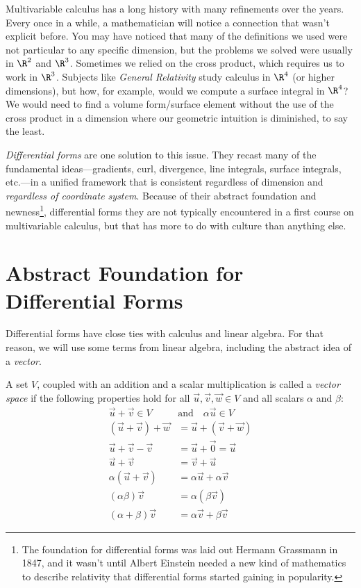
Multivariable calculus has a long history with many refinements over the years.
Every once in a while, a mathematician will notice a connection
that wasn't explicit before.  You may have noticed that many of the
definitions we used were not particular to any specific dimension, but the problems
we solved were usually in $\R^2$ and $\R^3$.  Sometimes we relied
on the cross product, which requires us to
work in $\R^3$.  
Subjects like \emph{General Relativity} study
calculus in $\R^4$ (or higher dimensions), but how, for example,
would we compute a surface integral in $\R^4$?  We would need
to find a volume form/surface element without the use of the cross product in a dimension
where our geometric intuition is diminished, to say the least.

\emph{Differential forms} are one solution to this issue.
They recast many of the fundamental ideas---gradients, curl, divergence,
line integrals, surface integrals, etc.---in a unified framework that is consistent
regardless of dimension and \emph{regardless of coordinate system}.
Because of their abstract foundation and newness\footnote{ 
The foundation for differential forms was laid out Hermann Grassmann
in 1847, and it wasn't until Albert Einstein needed a new kind
of mathematics to describe relativity that differential forms
started gaining in popularity.}, differential forms they are not typically encountered in a
first course on multivariable calculus, but that has more to do with culture
than anything else.

\section{Abstract Foundation for Differential Forms}

Differential forms have close ties with calculus and linear algebra.
For that reason, we will use some terms from linear algebra, including the
abstract idea of a \emph{vector}.

\begin{definition}
	A set $V$, coupled with an addition and a
	scalar multiplication is called a \emph{vector space} if
	the following properties hold for all $\vec u,\vec v,\vec w\in V$
	and all scalars $\alpha$ and $\beta$:
	\begin{align*}
		\vec u+\vec v\in V\quad&\text{and}\quad \alpha\vec u\in V\tag{Closure}\\
		(\vec u+\vec v)+\vec w&=\vec u+(\vec v+\vec w)\tag{Associativity}\\
		\vec u + \vec v - \vec v &= \vec u+\vec 0 = \vec u\tag{Identity}\\
		\vec u+\vec v&=\vec v+\vec u\tag{Commutativity}\\
		\alpha(\vec u+\vec v)&=\alpha\vec u+\alpha \vec v\tag{Distributivity}\\
		(\alpha\beta)\vec v&=\alpha(\beta \vec v)\tag{Scalar Associativity}\\
		(\alpha+\beta)\vec v&=\alpha\vec v+\beta \vec v\tag{Scalar Distributivity}
	\end{align*}
\end{definition}

